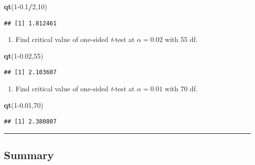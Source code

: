 \documentclass[
  openany]{book}
\newenvironment{Shaded}{\begin{snugshade}}{\end{snugshade}}
\newcommand{\DecValTok}[1]{\textcolor[rgb]{0.00,0.00,0.81}{#1}}
\newcommand{\FloatTok}[1]{\textcolor[rgb]{0.00,0.00,0.81}{#1}}
\newcommand{\FunctionTok}[1]{\textcolor[rgb]{0.13,0.29,0.53}{\textbf{#1}}}
\newcommand{\NormalTok}[1]{#1}
\newcommand{\SpecialCharTok}[1]{\textcolor[rgb]{0.81,0.36,0.00}{\textbf{#1}}}
\providecommand{\tightlist}{%
  \setlength{\itemsep}{0pt}\setlength{\parskip}{0pt}}
\begin{document}
\begin{Shaded}
\begin{Highlighting}[]
\FunctionTok{qt}\NormalTok{(}\DecValTok{1}\FloatTok{{-}0.1}\SpecialCharTok{/}\DecValTok{2}\NormalTok{,}\DecValTok{10}\NormalTok{)}
\end{Highlighting}
\end{Shaded}

\begin{verbatim}
## [1] 1.812461
\end{verbatim}

\begin{enumerate}
\def\labelenumi{\arabic{enumi}.}
\setcounter{enumi}{1}
\tightlist
\item
  Find critical value of one-sided \emph{t}-test at \(\alpha=0.02\) with 55 df.
\end{enumerate}

\begin{Shaded}
\begin{Highlighting}[]
\FunctionTok{qt}\NormalTok{(}\DecValTok{1}\FloatTok{{-}0.02}\NormalTok{,}\DecValTok{55}\NormalTok{)}
\end{Highlighting}
\end{Shaded}

\begin{verbatim}
## [1] 2.103607
\end{verbatim}

\begin{enumerate}
\def\labelenumi{\arabic{enumi}.}
\setcounter{enumi}{2}
\tightlist
\item
  Find critical value of one-sided \emph{t}-test at \(\alpha=0.01\) with 70 df.
\end{enumerate}

\begin{Shaded}
\begin{Highlighting}[]
\FunctionTok{qt}\NormalTok{(}\DecValTok{1}\FloatTok{{-}0.01}\NormalTok{,}\DecValTok{70}\NormalTok{)}
\end{Highlighting}
\end{Shaded}

\begin{verbatim}
## [1] 2.380807
\end{verbatim}

\begin{center}\rule{0.5\linewidth}{0.5pt}\end{center}

\subsection{Summary}\label{summary}
\end{document}
